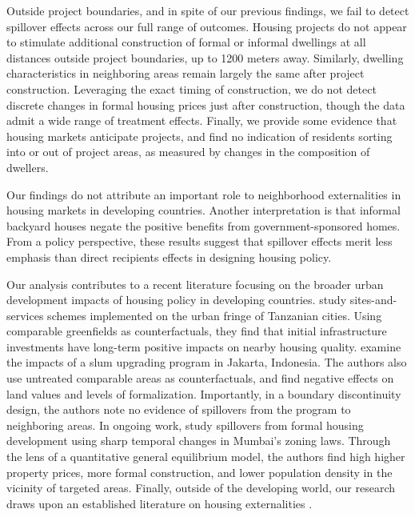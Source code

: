\documentclass[12pt]{article}
\begin{document}
Outside project boundaries, and in spite of our previous findings, we fail to detect spillover effects  across our full range of outcomes.  Housing projects do not appear to stimulate additional construction of formal or informal dwellings at all distances outside project boundaries, up to 1200 meters away. Similarly, dwelling characteristics in neighboring areas remain largely the same after project construction.  Leveraging the exact timing of construction, we do not detect discrete changes in formal housing prices just after construction, though the data admit a wide range of treatment effects. Finally, we provide some evidence that housing markets anticipate projects, and find no indication of residents sorting into or out of project areas, as measured by changes in the composition of dwellers. 

Our findings do not attribute an important role to neighborhood externalities in housing markets in developing countries.  Another interpretation is that informal backyard houses negate the positive benefits from government-sponsored homes. From a policy perspective, these results suggest that spillover effects merit less emphasis than direct recipients effects in designing housing policy.  

Our analysis contributes to a recent literature focusing on the broader urban development impacts of housing policy in developing countries. \cite{baruah2017planning} study sites-and-services schemes implemented on the urban fringe of Tanzanian cities. Using comparable greenfields as counterfactuals, they find that initial infrastructure investments have long-term positive impacts on nearby housing quality. \cite{harari2018slum} examine the impacts of a slum upgrading program in Jakarta, Indonesia. The authors also use untreated comparable areas as counterfactuals, and find negative effects on land values and levels of formalization. Importantly, in a boundary discontinuity design, the authors note no evidence of spillovers from the program to neighboring areas. In ongoing work, \cite{gechter2018slums} study spillovers from formal housing development using sharp temporal changes in Mumbai's zoning laws. Through the lens of a quantitative general equilibrium model, the authors find high higher property prices,  more formal construction, and lower population density in the vicinity of targeted areas. Finally, outside of the developing world, our research draws upon an established literature on housing externalities \citep{rossi2010housing,hornbeck2017creative,diamond2016wants}. 
\end{document}
